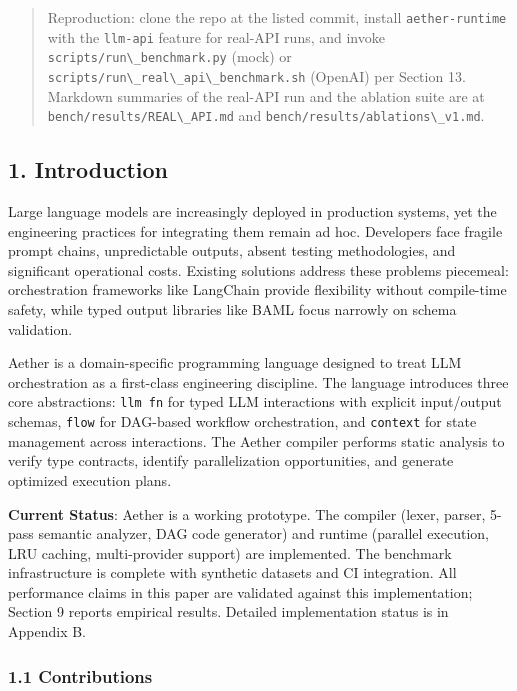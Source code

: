 \documentclass[
]{article}
\newcommand{\passthrough}[1]{#1}
\begin{document}
\begin{quote}
Reproduction: clone the repo at the listed commit, install
\passthrough{\lstinline!aether-runtime!} with the
\passthrough{\lstinline!llm-api!} feature for real-API runs, and invoke
\passthrough{\lstinline!scripts/run\_benchmark.py!} (mock) or
\passthrough{\lstinline!scripts/run\_real\_api\_benchmark.sh!} (OpenAI)
per Section 13. Markdown summaries of the real-API run and the ablation
suite are at \passthrough{\lstinline!bench/results/REAL\_API.md!} and
\passthrough{\lstinline!bench/results/ablations\_v1.md!}.
\end{quote}

\subsection{1. Introduction}\label{introduction}

Large language models are increasingly deployed in production systems,
yet the engineering practices for integrating them remain ad hoc.
Developers face fragile prompt chains, unpredictable outputs, absent
testing methodologies, and significant operational costs. Existing
solutions address these problems piecemeal: orchestration frameworks
like LangChain provide flexibility without compile-time safety, while
typed output libraries like BAML focus narrowly on schema validation.

Aether is a domain-specific programming language designed to treat LLM
orchestration as a first-class engineering discipline. The language
introduces three core abstractions: \passthrough{\lstinline!llm fn!} for
typed LLM interactions with explicit input/output schemas,
\passthrough{\lstinline!flow!} for DAG-based workflow orchestration, and
\passthrough{\lstinline!context!} for state management across
interactions. The Aether compiler performs static analysis to verify
type contracts, identify parallelization opportunities, and generate
optimized execution plans.

\textbf{Current Status}: Aether is a working prototype. The compiler
(lexer, parser, 5-pass semantic analyzer, DAG code generator) and
runtime (parallel execution, LRU caching, multi-provider support) are
implemented. The benchmark infrastructure is complete with synthetic
datasets and CI integration. All performance claims in this paper are
validated against this implementation; Section 9 reports empirical
results. Detailed implementation status is in Appendix B.

\subsubsection{1.1 Contributions}\label{contributions}
\end{document}
